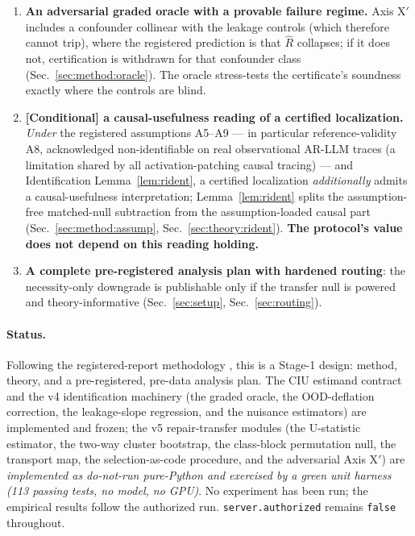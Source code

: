 \documentclass[11pt]{article}
\theoremstyle{plain}
\theoremstyle{definition}
\newcommand{\Rhat}{\widehat{R}}
\begin{document}
\begin{enumerate}[leftmargin=1.4em,itemsep=2pt]
  (Sec.~\ref{sec:method:inference}, Sec.~\ref{sec:setup:power}); and a
  selective-inference correction in which every data-adaptive choice is a paid-for
  selection event \cite{cox1975note,fithian2014optimal,benjamini2009selective,berk2013validpostselection}
  (Sec.~\ref{sec:si}). This is what makes the certificate reproducible and
  selective-inference-correct.
  \item \textbf{An adversarial graded oracle with a provable failure regime.} Axis
  X$'$ includes a confounder collinear with the leakage controls (which therefore
  cannot trip), where the registered prediction is that $\Rhat$ collapses; if it does
  not, certification is withdrawn for that confounder class
  (Sec.~\ref{sec:method:oracle}). The oracle stress-tests the certificate's soundness
  exactly where the controls are blind.
  \item \textbf{[Conditional] a causal-usefulness reading of a certified
  localization.} \emph{Under} the registered assumptions A5--A9 --- in particular
  reference-validity A8, acknowledged non-identifiable on real observational AR-LLM
  traces (a limitation shared by all activation-patching causal tracing) --- and
  Identification Lemma~\ref{lem:rident}, a certified localization \emph{additionally}
  admits a causal-usefulness interpretation; Lemma~\ref{lem:rident} splits the
  assumption-free matched-null subtraction from the assumption-loaded causal part
  (Sec.~\ref{sec:method:assump}, Sec.~\ref{sec:theory:rident}). \textbf{The protocol's
  value does not depend on this reading holding.}
  \item \textbf{A complete pre-registered analysis plan with hardened routing}: the
  necessity-only downgrade is publishable only if the transfer null is powered and
  theory-informative (Sec.~\ref{sec:setup}, Sec.~\ref{sec:routing}).
\end{enumerate}

\paragraph{Status.} Following the registered-report methodology
\cite{chambers2014registered,nosek2018preregistration}, this is a Stage-1 design:
method, theory, and a pre-registered, pre-data analysis plan. The CIU estimand
contract and the v4 identification machinery (the graded oracle, the OOD-deflation
correction, the leakage-slope regression, and the nuisance estimators) are
implemented and frozen; the v5 repair-transfer modules (the U-statistic estimator,
the two-way cluster bootstrap, the class-block permutation null, the transport map,
the selection-as-code procedure, and the adversarial Axis X$'$) are \emph{implemented
as do-not-run pure-Python and exercised by a green unit harness (113 passing tests,
no model, no GPU)}. No experiment has been run; the empirical results follow the
authorized run. \texttt{server.authorized} remains \texttt{false} throughout.
\end{document}
